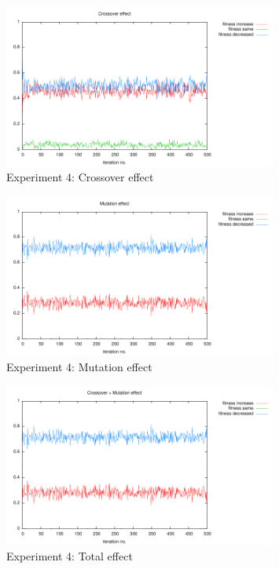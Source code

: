 \documentclass[12pt,a4paper]{article}
\begin{document}
\begin{figure}
\centering
\includegraphics[width=0.8\textwidth]{results/4/1-cs.pdf}
\caption{Experiment 4: Crossover effect}
\label{pic-e4-cs}
\end{figure}

\begin{figure}
\centering
\includegraphics[width=0.8\textwidth]{results/4/1-ms.pdf}
\caption{Experiment 4: Mutation effect}
\label{pic-e4-ms}
\end{figure}

\begin{figure}
\centering
\includegraphics[width=0.8\textwidth]{results/4/1-cms.pdf}
\caption{Experiment 4: Total effect}
\label{pic-e4-cms}
\end{figure}
\end{document}
